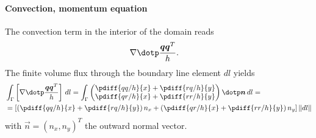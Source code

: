 \paragraph*{Convection, momentum equation}
The convection term in the interior of the domain reads
\begin{align}
    &\nabla \dotp \frac{\vec{q}\vec{q}^T}{h}.
\end{align}
The finite volume flux through the boundary line element $dl$ yields
\begin{align}
    &\int_\Gamma \left[ \nabla \dotp \frac{\vec{q}\vec{q}^T}{h}\right] \, dl =
    \int_\Gamma
    \begin{pmatrix}
        \pdiff{qq/h}{x} + \pdiff{rq/h}{y} \\
        \pdiff{qr/h}{x} + \pdiff{rr/h}{y}
    \end{pmatrix}
    \dotp \vec{n}\, dl
    = \\
    & =
    \left[ \left( \pdiff{qq/h}{x} + \pdiff{rq/h}{y} \right) n_x +
    \left( \pdiff{qr/h}{x} + \pdiff{rr/h}{y} \right) n_y \right] \norm{dl}
\end{align}
with $\vec{n} = (n_x, n_y)^T$ the outward normal vector.


